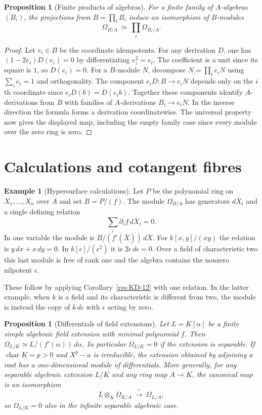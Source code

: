 \documentclass[11pt,oneside,openany]{book}
\newtheorem{proposition}[theorem]{Proposition}
\theoremstyle{definition}
\newtheorem{example}[theorem]{Example}
\theoremstyle{remark}
\begin{document}
\begin{proposition}[Finite products of algebras]\label{res:KD-20}
For a finite family of $A$-algebras $(B_i)$, the projections from $B=\prod_i B_i$ induce an isomorphism of $B$-modules
\[
 \Omega_{B/A}\ \simeq\ \prod_i\Omega_{B_i/A}.
\]
\end{proposition}

\begin{proof}
Let $e_i\in B$ be the coordinate idempotents. For any derivation $D$, one has $(1-2e_i)D(e_i)=0$ by differentiating $e_i^2=e_i$. The coefficient is a unit since its square is $1$, so $D(e_i)=0$. For a $B$-module $N$, decompose $N=\prod_i e_iN$ using $\sum_i e_i=1$ and orthogonality. The component $e_iD:B\to e_iN$ depends only on the $i$th coordinate since $e_iD(b)=D(e_i b)$. Together these components identify $A$-derivations from $B$ with families of $A$-derivations $B_i\to e_iN$. In the inverse direction the formula forms a derivation coordinatewise. The universal property now gives the displayed map, including the empty family case since every module over the zero ring is zero.
\end{proof}

\section{Calculations and cotangent fibres}

\begin{example}[Hypersurface calculations]\label{res:KD-21}
Let $P$ be the polynomial ring on $X_1,\ldots,X_n$ over $A$ and set $B=P/(f)$. The module $\Omega_{B/A}$ has generators $d\bar X_i$ and a single defining relation
\[
 \sum_i \overline{\partial_i f}\,d\bar X_i=0.
\]
In one variable the module is $B/(f'(\bar X))\,d\bar X$. For $k[x,y]/(xy)$ the relation is $y\,dx+x\,dy=0$. In $k[\epsilon]/(\epsilon^2)$ it is $2\epsilon\,d\epsilon=0$. Over a field of characteristic two this last module is free of rank one and the algebra contains the nonzero nilpotent $\epsilon$.
\end{example}

These follow by applying Corollary~\ref{res:KD-12} with one relation. In the latter example, when $k$ is a field and its characteristic is different from two, the module is instead the copy of $k\,d\epsilon$ with $\epsilon$ acting by zero.

\begin{proposition}[Differentials of field extensions]\label{res:KD-22}
Let $L=K[\alpha]$ be a finite simple algebraic field extension with minimal polynomial $f$. Then $\Omega_{L/K}\simeq L/(f'(\alpha))\,d\alpha$. In particular $\Omega_{L/K}=0$ if the extension is separable. If $\operatorname{char}K=p>0$ and $X^p-a$ is irreducible, the extension obtained by adjoining a root has a one-dimensional module of differentials. More generally, for any separable algebraic extension $L/K$ and any ring map $A\to K$, the canonical map is an isomorphism
\[
 L\otimes_K\Omega_{K/A}\ \xrightarrow{\ \sim\ }\ \Omega_{L/A},
\]
so $\Omega_{L/K}=0$ also in the infinite separable algebraic case.
\end{proposition}
\end{document}
